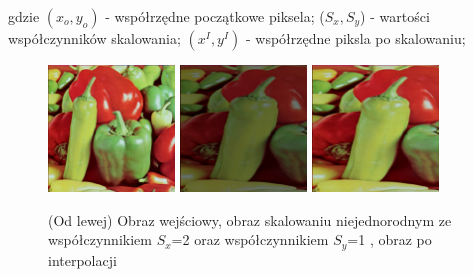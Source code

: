 \documentclass[final,a4paper,openany,12pt]{mwbk}
\begin{document}
gdzie $(x_{o},y_{o})$ - współrzędne początkowe piksela; ($S_{x}, S_{y}$) - wartości współczynników skalowania; $(x^I,y^I)$ - współrzędne piksla po skalowaniu;

\begin{figure}[H]
	\begin{center}
		\includegraphics[width=0.3\textwidth]{1/1Geo_ScaleNJ_Original}
		\includegraphics[width=0.3\textwidth]{1/1Geo_ScaleNJ_Result}
		\includegraphics[width=0.3\textwidth]{1/1Geo_ScaleNJ_Result_Interp}
	\end{center}
	\caption{(Od lewej) Obraz wejściowy, obraz skalowaniu niejednorodnym ze współczynnikiem $S_{x}$=2 oraz współczynnikiem $S_{y}$=1 , obraz po interpolacji }
\end{figure}
\end{document}
